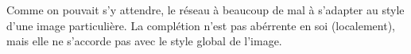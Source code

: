 \documentclass[12pt]{article}
\begin{document}
Comme on pouvait s'y attendre, le réseau à beaucoup de mal à s'adapter au style d'une image particulière. La complétion n'est pas abérrente en soi (localement), mais elle ne s'accorde pas avec le style global de l'image.

\newpage



\end{document}

